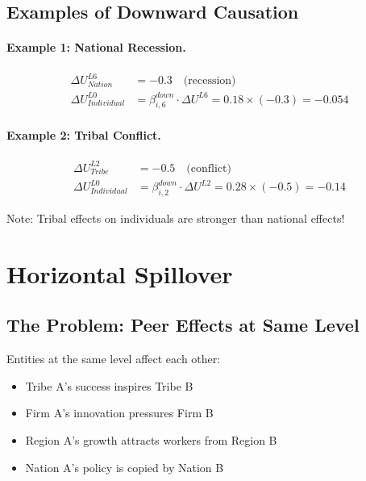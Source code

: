 \subsection{Examples of Downward Causation}

\paragraph{Example 1: National Recession.}
\begin{align}
\Delta U^{L6}_{Nation} &= -0.3 \quad \text{(recession)} \\
\Delta U^{L0}_{Individual} &= \beta^{down}_{i,6} \cdot \Delta U^{L6} = 0.18 \times (-0.3) = -0.054
\end{align}

\paragraph{Example 2: Tribal Conflict.}
\begin{align}
\Delta U^{L2}_{Tribe} &= -0.5 \quad \text{(conflict)} \\
\Delta U^{L0}_{Individual} &= \beta^{down}_{i,2} \cdot \Delta U^{L2} = 0.28 \times (-0.5) = -0.14
\end{align}

Note: Tribal effects on individuals are stronger than national effects!

\section{Horizontal Spillover}
\label{sec:aaa-horizontal}

\subsection{The Problem: Peer Effects at Same Level}

Entities at the same level affect each other:
\begin{itemize}
\item Tribe A's success inspires Tribe B
\item Firm A's innovation pressures Firm B
\item Region A's growth attracts workers from Region B
\item Nation A's policy is copied by Nation B
\end{itemize}

